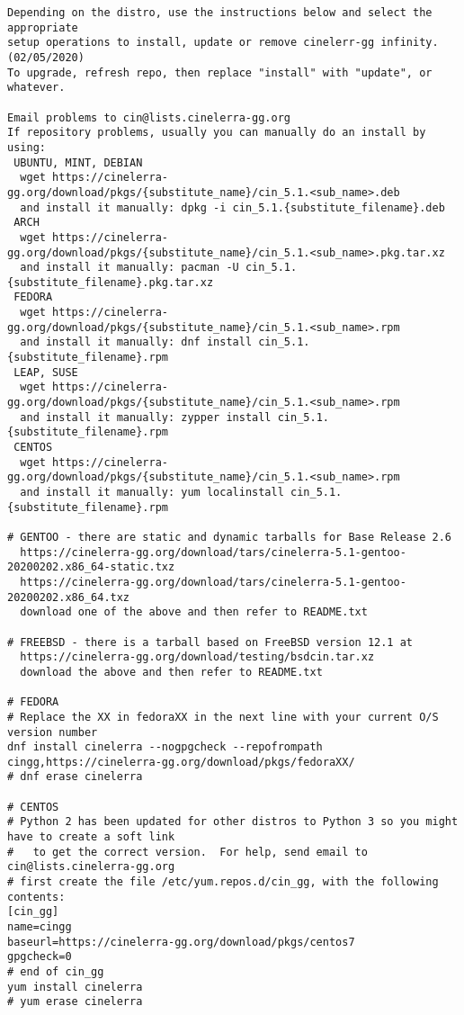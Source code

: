 {\tiny
\begin{verbatim}
Depending on the distro, use the instructions below and select the appropriate
setup operations to install, update or remove cinelerr-gg infinity.  (02/05/2020)
To upgrade, refresh repo, then replace "install" with "update", or whatever.

Email problems to cin@lists.cinelerra-gg.org
If repository problems, usually you can manually do an install by using:
 UBUNTU, MINT, DEBIAN
  wget https://cinelerra-gg.org/download/pkgs/{substitute_name}/cin_5.1.<sub_name>.deb
  and install it manually: dpkg -i cin_5.1.{substitute_filename}.deb
 ARCH
  wget https://cinelerra-gg.org/download/pkgs/{substitute_name}/cin_5.1.<sub_name>.pkg.tar.xz
  and install it manually: pacman -U cin_5.1.{substitute_filename}.pkg.tar.xz
 FEDORA
  wget https://cinelerra-gg.org/download/pkgs/{substitute_name}/cin_5.1.<sub_name>.rpm
  and install it manually: dnf install cin_5.1.{substitute_filename}.rpm
 LEAP, SUSE
  wget https://cinelerra-gg.org/download/pkgs/{substitute_name}/cin_5.1.<sub_name>.rpm
  and install it manually: zypper install cin_5.1.{substitute_filename}.rpm
 CENTOS
  wget https://cinelerra-gg.org/download/pkgs/{substitute_name}/cin_5.1.<sub_name>.rpm
  and install it manually: yum localinstall cin_5.1.{substitute_filename}.rpm

# GENTOO - there are static and dynamic tarballs for Base Release 2.6
  https://cinelerra-gg.org/download/tars/cinelerra-5.1-gentoo-20200202.x86_64-static.txz
  https://cinelerra-gg.org/download/tars/cinelerra-5.1-gentoo-20200202.x86_64.txz
  download one of the above and then refer to README.txt

# FREEBSD - there is a tarball based on FreeBSD version 12.1 at
  https://cinelerra-gg.org/download/testing/bsdcin.tar.xz
  download the above and then refer to README.txt

# FEDORA
# Replace the XX in fedoraXX in the next line with your current O/S version number
dnf install cinelerra --nogpgcheck --repofrompath cingg,https://cinelerra-gg.org/download/pkgs/fedoraXX/
# dnf erase cinelerra

# CENTOS
# Python 2 has been updated for other distros to Python 3 so you might have to create a soft link
#   to get the correct version.  For help, send email to cin@lists.cinelerra-gg.org
# first create the file /etc/yum.repos.d/cin_gg, with the following contents:
[cin_gg]
name=cingg
baseurl=https://cinelerra-gg.org/download/pkgs/centos7
gpgcheck=0
# end of cin_gg
yum install cinelerra
# yum erase cinelerra


\end{verbatim}}

